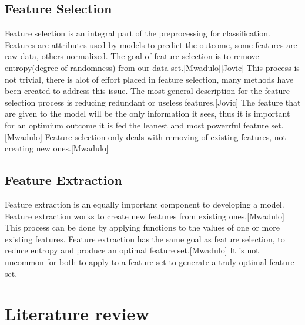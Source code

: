\documentclass[confrence]{IEEEtran}
\begin{document}
\subsection*{Feature Selection}
Feature selection is an integral part of the preprocessing for classification.
Features are attributes used by models to predict the outcome, some features are raw data, others normalized.
The goal of feature selection is to remove entropy(degree of randomness) from our data set.[Mwadulo][Jovic]
This process is not trivial, there is alot of effort placed in feature selection, many methods have been created to address this issue.
The most general description for the feature selection process is reducing redundant or useless features.[Jovic]
The feature that are given to the model will be the only information it sees, thus it is important for an optimium outcome it is fed the leanest and most powerrful feature set.[Mwadulo]
Feature selection only deals with removing of existing features, not creating new ones.[Mwadulo]
\subsection*{Feature Extraction}
Feature extraction is an equally important component to developing a model.
Feature extraction works to create new features from existing ones.[Mwadulo]
This process can be done by applying functions to the values of one or more existing features.
Feature extraction has the same goal as feature selection, to reduce entropy and produce an optimal feature set.[Mwadulo]
It is not uncommon for both to apply to a feature set to generate a truly optimal feature set.
\section*{Literature review}
\end{document}

